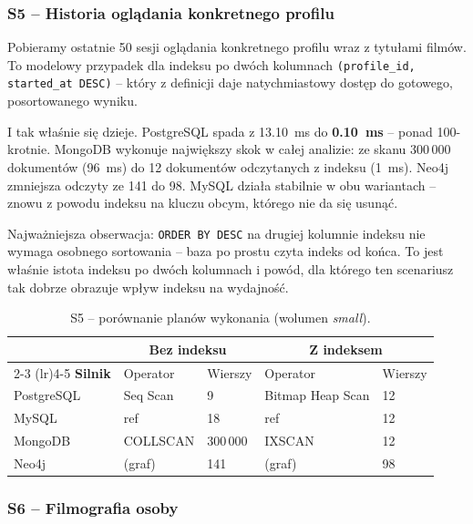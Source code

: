 \subsubsection*{S5 -- Historia oglądania konkretnego profilu}

Pobieramy ostatnie 50 sesji oglądania konkretnego profilu wraz
z tytułami filmów. To modelowy przypadek dla indeksu po dwóch
kolumnach \texttt{(profile\_id, started\_at DESC)} -- który z
definicji daje natychmiastowy dostęp do gotowego, posortowanego
wyniku.

I tak właśnie się dzieje. PostgreSQL spada z 13.10~ms do
\textbf{0.10~ms} -- ponad 100-krotnie. MongoDB wykonuje największy
skok w całej analizie: ze skanu 300\,000 dokumentów (96~ms) do
12 dokumentów odczytanych z indeksu (1~ms). Neo4j zmniejsza odczyty
ze 141 do 98. MySQL działa stabilnie w obu wariantach -- znowu
z powodu indeksu na kluczu obcym, którego nie da się usunąć.

Najważniejsza obserwacja: \texttt{ORDER BY DESC} na drugiej kolumnie
indeksu nie wymaga osobnego sortowania -- baza po prostu czyta
indeks od końca. To jest właśnie istota indeksu po dwóch kolumnach
i powód, dla którego ten scenariusz tak dobrze obrazuje wpływ
indeksu na wydajność.

\begin{table}[H]
    \centering
    \small
    \begin{tabular}{lllll}
        \toprule
        & \multicolumn{2}{c}{\textbf{Bez indeksu}} & \multicolumn{2}{c}{\textbf{Z indeksem}} \\
        \cmidrule(lr){2-3} \cmidrule(lr){4-5}
        \textbf{Silnik} & Operator & Wierszy & Operator & Wierszy \\
        \midrule
        PostgreSQL & Seq Scan & 9        & Bitmap Heap Scan & 12 \\
        MySQL      & ref      & 18       & ref              & 12 \\
        MongoDB    & COLLSCAN & 300\,000 & IXSCAN           & 12 \\
        Neo4j      & (graf)   & 141      & (graf)           & 98 \\
        \bottomrule
    \end{tabular}
    \caption{S5 -- porównanie planów wykonania (wolumen \emph{small}).}
    \label{tab:explain_s5}
\end{table}

\subsubsection*{S6 -- Filmografia osoby}

